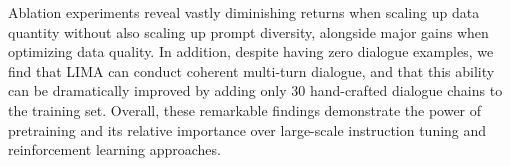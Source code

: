 Ablation experiments reveal vastly diminishing returns when scaling up data quantity without also scaling up prompt diversity, alongside major gains when optimizing data quality.
In addition, despite having zero dialogue examples, we find that LIMA can conduct coherent multi-turn dialogue, and that this ability can be dramatically improved by adding only 30 hand-crafted dialogue chains to the training set.
Overall, these remarkable findings demonstrate the power of pretraining and its relative importance over large-scale instruction tuning and reinforcement learning approaches.



